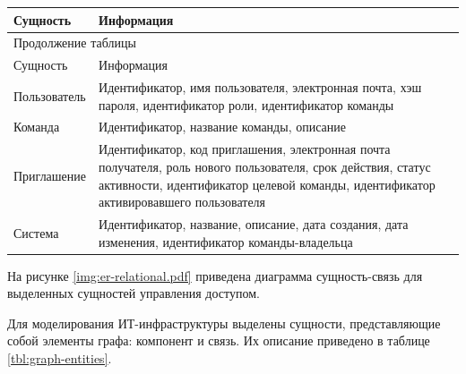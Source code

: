 \begin{center}
    \begin{tabularx}{\textwidth}{|X|X|}
        \caption{\label{tbl:relational-entities}Сущности системы для управления
        доступом} \\ \hline
        Сущность & Информация \\ \hline
        \endfirsthead

        \multicolumn{2}{l}{{Продолжение таблицы\ \thetable{}}} \\ \hline
        Сущность & Информация \\ \hline
        \endhead

        \endfoot
        \endlastfoot

        Пользователь & Идентификатор, имя пользователя, электронная почта, хэш
        пароля, идентификатор роли, идентификатор команды \\ \hline

        Команда & Идентификатор, название команды, описание \\ \hline

        Приглашение & Идентификатор, код приглашения, электронная почта
        получателя, роль нового пользователя, срок действия, статус активности,
        идентификатор целевой команды, идентификатор активировавшего
        пользователя \\ \hline

        Система & Идентификатор, название, описание, дата создания, дата
        изменения, идентификатор команды-владельца \\ \hline
    \end{tabularx}
\end{center}

На рисунке \ref{img:er-relational.pdf} приведена диаграмма сущность-связь для
выделенных сущностей управления доступом.

Для моделирования ИТ-инфраструктуры выделены сущности, представляющие собой
элементы графа: компонент и связь. Их описание приведено в таблице
\ref{tbl:graph-entities}.

